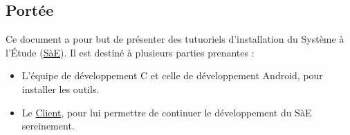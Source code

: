 \subsection{Portée} %
Ce document a pour but de présenter des tutuoriels d'installation du Système à l'Étude (\hyperref[SaE]{SàE}). Il est destiné à plusieurs parties prenantes :
\begin{itemize} %
    \item L'équipe de développement C et celle de développement Android, pour installer les outils.
    \item Le \hyperref[client_kereval]{Client}, pour lui permettre de continuer le développement du SàE sereinement.
\end{itemize}